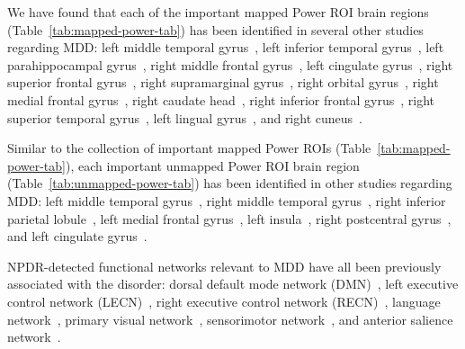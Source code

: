 \documentclass[10pt,letterpaper]{article}\usepackage[]{graphicx}\usepackage[]{color}
\begin{document}
We have found that each of the important mapped Power ROI brain regions (Table~\ref{tab:mapped-power-tab}) has been identified in several other studies regarding MDD: left middle temporal gyrus~\cite{xu2019-2,peterson2009,husain2019}, left inferior temporal gyrus~\cite{ramezani2014,rolls2017}, left parahippocampal gyrus~\cite{ramezani2014,zeng2012}, right middle frontal gyrus~\cite{reynolds2014,fitzgerald2008}, left cingulate gyrus~\cite{hamani2011,mclaren2016}, right superior frontal gyrus~\cite{tao2013,salvadore2011}, right supramarginal gyrus~\cite{peng2015,tu2018}, right orbital gyrus~\cite{rolls2017,yan2019}, right medial frontal gyrus~\cite{lemogne2009,tao2013}, right caudate head~\cite{pizzagalli2009,bluhm2009}, right inferior frontal gyrus~\cite{tao2013,tu2018}, right superior temporal gyrus~\cite{pan2015}, left lingual gyrus~\cite{jung2014,couvy-duchesne2018}, and right cuneus~\cite{bai2018,wei2018}.

Similar to the collection of important mapped Power ROIs (Table~\ref{tab:mapped-power-tab}), each important unmapped Power ROI brain region (Table~\ref{tab:unmapped-power-tab}) has been identified in other studies regarding MDD: left middle temporal gyrus~\cite{xu2019-2,peterson2009,husain2019}, right middle temporal gyrus~\cite{rolls2017}, right inferior parietal lobule~\cite{cooney2010}, left medial frontal gyrus~\cite{fitzgerald2008}, left insula~\cite{schmaal2017,li2017}, right postcentral gyrus~\cite{schmaal2017}, and left cingulate gyrus~\cite{mclaren2016,hamani2011}.

NPDR-detected functional networks relevant to MDD have all been previously associated with the disorder: dorsal default mode network (DMN)~\cite{hamilton2015,yan2019-2,dutta2019,lois2016,guo2014-2,menon2011}, left executive control network (LECN)~\cite{zhao2019,ellard2018,liu2012}, right executive control network (RECN)~\cite{zhao2019,ellard2018,liu2012}, language network~\cite{schultz2018,wu2017}, primary visual network~\cite{wu2017}, sensorimotor network~\cite{wu2017,zhi2018,zhuo2017}, and anterior salience network~\cite{sikora2017,wang2016}.
\end{document}
